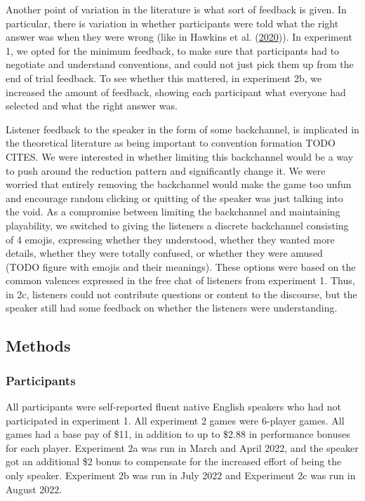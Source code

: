 \documentclass[
  english,
  a4paper,
]{article}
\begin{document}
Another point of variation in the literature is what sort of feedback is given. In particular, there is variation in whether participants were told what the right answer was when they were wrong (like in Hawkins et al. (\protect\hyperlink{ref-hawkinsCharacterizingDynamicsLearning2020}{2020})). In experiment 1, we opted for the minimum feedback, to make sure that participants had to negotiate and understand conventions, and could not just pick them up from the end of trial feedback. To see whether this mattered, in experiment 2b, we increased the amount of feedback, showing each participant what everyone had selected and what the right answer was.

Listener feedback to the speaker in the form of some backchannel, is implicated in the theoretical literature as being important to convention formation TODO CITES. We were interested in whether limiting this backchannel would be a way to push around the reduction pattern and significantly change it. We were worried that entirely removing the backchannel would make the game too unfun and encourage random clicking or quitting of the speaker was just talking into the void. As a compromise between limiting the backchannel and maintaining playability, we switched to giving the listeners a discrete backchannel consisting of 4 emojis, expressing whether they understood, whether they wanted more details, whether they were totally confused, or whether they were amused (TODO figure with emojis and their meanings). These options were based on the common valences expressed in the free chat of listeners from experiment 1. Thus, in 2c, listeners could not contribute questions or content to the discourse, but the speaker still had some feedback on whether the listeners were understanding.

\hypertarget{methods-1}{%
\subsection{Methods}\label{methods-1}}

\hypertarget{participants-1}{%
\subsubsection{Participants}\label{participants-1}}

All participants were self-reported fluent native English speakers who had not participated in experiment 1.
All experiment 2 games were 6-player games. All games had a base pay of \$11, in addition to up to \$2.88 in performance bonuses for each player.
Experiment 2a was run in March and April 2022, and the speaker got an additional \$2 bonus to compensate for the increased effort of being the only speaker.
Experiment 2b was run in July 2022 and Experiment 2c was run in August 2022.
\end{document}
